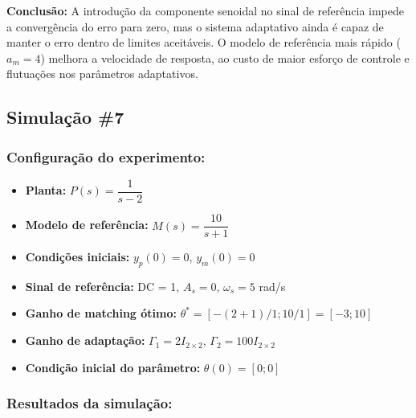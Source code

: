 \documentclass[10pt]{article}
\begin{document}
\textbf{Conclusão:} A introdução da componente senoidal no sinal de referência impede a convergência do erro para zero, mas o sistema adaptativo ainda é capaz de manter o erro dentro de limites aceitáveis. O modelo de referência mais rápido ($a_m = 4$) melhora a velocidade de resposta, ao custo de maior esforço de controle e flutuações nos parâmetros adaptativos.

\newpage

\subsection{Simulação \#7}
\subsubsection{Configuração do experimento:}
\begin{itemize}
\item \textbf{Planta:} $P(s) = \dfrac{1}{s - 2}$
\item \textbf{Modelo de referência:} $M(s) = \dfrac{10}{s + 1}$
\item \textbf{Condições iniciais:} $y_p(0)=0$, $y_m(0)=0$
\item \textbf{Sinal de referência:} DC = 1, $A_s=0$, $\omega_s=5$ rad/s
\item \textbf{Ganho de matching ótimo:} $\theta^* = [-(2+1)/1;10/1] = [-3;10]$
\item \textbf{Ganho de adaptação:} $\Gamma_1 = 2I_{2\times2}$, $\Gamma_2 = 100I_{2\times2}$
\item \textbf{Condição inicial do parâmetro:} $\theta(0) = [0;0]$
\end{itemize}

\subsubsection{Resultados da simulação:}
\end{document}
